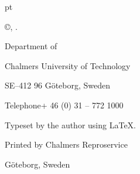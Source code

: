 \vspace*{50 pt}
{
  \thispagestyle{empty}         %

   pt

  \thesistitle

  \thesissubtitle

  \textsc{\thesisauthor}

  \vskip 1pc
  \copyright\enskip \textsc{\thesisauthor, \thesisyear.}
  \vskip 1pc


  \vskip 1pc

  Department of \thesisdepartment

  Chalmers University of Technology

  SE--412 96 Göteborg, Sweden

  Telephone\enskip+ 46 (0) 31 -- 772 1000

  \vfill

  \thesiscoverdescription

  \vskip 2pc

  Typeset by the author using \LaTeX.

  \vskip 1pc

  Printed by Chalmers Reproservice

  Göteborg, Sweden \thesisyear
}

\clearpage

